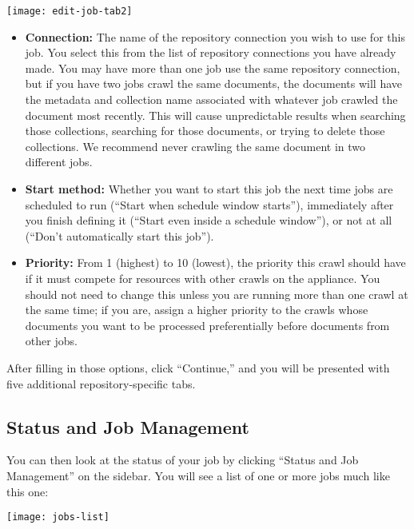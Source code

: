 \begin{changemargin}{1.5in}{0in}
\texttt{[image: edit-job-tab2]}


\begin{itemize}

\item \textbf{Connection:} The name of the repository connection you
wish to use for this job. You select this from the list of repository
connections you have already made. You may have more than one job use
the same repository connection, but if you have two jobs crawl the same
documents, the documents will have the metadata and collection name
associated with whatever job crawled the document most recently. This
will cause unpredictable results when searching those collections,
searching for those documents, or trying to delete those collections.
We recommend never crawling the same document in two different jobs.

\item \textbf{Start method:} Whether you want to start this job the next
time jobs are scheduled to run (``Start when schedule window starts''),
immediately after you finish defining it (``Start even inside a schedule
window''), or not at all (``Don't automatically start this job'').

\item \textbf{Priority:} From 1 (highest) to 10 (lowest), the priority
this crawl should have if it must compete for resources with other
crawls on the appliance. You should not need to change this unless you
are running more than one crawl at the same time; if you are, assign a
higher priority to the crawls whose documents you want to be processed
preferentially before documents from other jobs.

\end{itemize}

After filling in those options, click ``Continue,'' and you will be
presented with five additional repository-specific tabs. 



\subsection{\label{ManageJobs}Status and Job Management}

You can then look at the status of your job by clicking ``Status and 
Job Management'' on the sidebar. You will see a list of one or more jobs
much like this one:

\texttt{[image: jobs-list]}


\end{changemargin}
